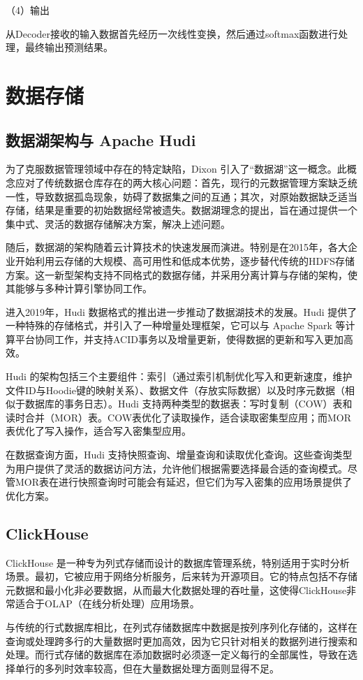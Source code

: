 （4）输出

从Decoder接收的输入数据首先经历一次线性变换，然后通过softmax函数进行处理，最终输出预测结果。

\section{数据存储}
\subsection{数据湖架构与 Apache Hudi}
为了克服数据管理领域中存在的特定缺陷，Dixon 引入了“数据湖”这一概念。此概念应对了传统数据仓库存在的两大核心问题：首先，现行的元数据管理方案缺乏统一性，导致数据孤岛现象，妨碍了数据集之间的互通；其次，对原始数据缺乏适当存储，结果是重要的初始数据经常被遗失。数据湖理念的提出，旨在通过提供一个集中式、灵活的数据存储解决方案，解决上述问题。

随后，数据湖的架构随着云计算技术的快速发展而演进。特别是在2015年，各大企业开始利用云存储的大规模、高可用性和低成本优势，逐步替代传统的HDFS存储方案。这一新型架构支持不同格式的数据存储，并采用分离计算与存储的架构，使其能够与多种计算引擎协同工作。

进入2019年，Hudi 数据格式的推出进一步推动了数据湖技术的发展。Hudi 提供了一种特殊的存储格式，并引入了一种增量处理框架，它可以与 Apache Spark 等计算平台协同工作，并支持ACID事务以及增量更新，使得数据的更新和写入更加高效。

Hudi 的架构包括三个主要组件：索引（通过索引机制优化写入和更新速度，维护文件ID与Hoodie键的映射关系）、数据文件（存放实际数据）以及时序元数据（相似于数据库的事务日志）。Hudi 支持两种类型的数据表：写时复制（COW）表和读时合并（MOR）表。COW表优化了读取操作，适合读取密集型应用；而MOR表优化了写入操作，适合写入密集型应用。

在数据查询方面，Hudi 支持快照查询、增量查询和读取优化查询。这些查询类型为用户提供了灵活的数据访问方法，允许他们根据需要选择最合适的查询模式。尽管MOR表在进行快照查询时可能会有延迟，但它们为写入密集的应用场景提供了优化方案。
\subsection{ClickHouse}
ClickHouse 是一种专为列式存储而设计的数据库管理系统，特别适用于实时分析场景。最初，它被应用于网络分析服务，后来转为开源项目。它的特点包括不存储元数据和最小化非必要数据，从而最大化数据处理的吞吐量，这使得ClickHouse非常适合于OLAP（在线分析处理）应用场景。

与传统的行式数据库相比，在列式存储数据库中数据是按列序列化存储的，这样在查询或处理跨多行的大量数据时更加高效，因为它只针对相关的数据列进行搜索和处理。而行式存储的数据库在添加数据时必须逐一定义每行的全部属性，导致在选择单行的多列时效率较高，但在大量数据处理方面则显得不足。

